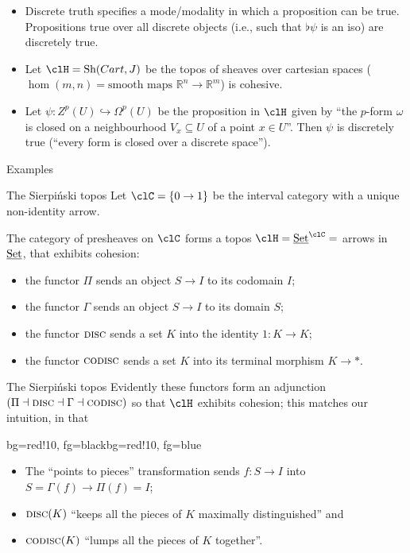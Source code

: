 \documentclass[presentation]{beamer}
\begin{document}
%
%
%
%
%
%
%
\begin{frame}
  \begin{itemize}
    \item<+-> Discrete truth specifies a \alert{mode/modality} in which a proposition can be true. Propositions true over all discrete objects (i.e., such that $\flat\psi$ is an iso) are discretely true.
    \item<+-> Let $\clH = \text{Sh}(Cart,J)$ be the topos of sheaves over cartesian spaces ($\hom(m,n) = \text{smooth maps }\mathbb{R}^n\to \mathbb{R}^m$) is cohesive. \item<+-> Let $\psi\colon Z^p(U) \hookrightarrow \Omega^p(U)$ be the proposition in $\clH$ given by ``the $p$-form $\omega$ is closed on a neighbourhood $V_x\subseteq U$ of a point $x\in U$''. Then $\psi$ is discretely true (``every form is closed over a discrete space'').
  \end{itemize}
\end{frame}
%
%
%
%
%
%
%
\begin{frame}
  \Huge
  \centering
  Examples
\end{frame}
%
%
%
%
%
%
%
\begin{frame}{The Sierpiński topos}
  Let $\clC = \{0\to 1\}$ be the interval category with a unique non-identity arrow.
  \onslide<+->
  
  \medskip
  
  The category of \alert{presheaves} on $\clC$ forms a topos $\clH=\Set^{\clC} =$ arrows in $\underline{\text{Set}}$, that exhibits cohesion:
  \begin{itemize}
    \item<+-> the functor \alert{$\Pi$} sends an object $S\to I$ to its \alert{codomain} $I$;
    \item<+-> the functor \alert{$\Gamma$} sends an object $S\to I$ to its \alert{domain} $S$;
    \item<+-> the functor \alert{$\textsc{disc}$} sends a set $K$ into the \alert{identity} $1\colon K\to K$;
    \item<+-> the functor \alert{$\textsc{codisc}$} sends a set $K$ into its \alert{terminal} morphism $K\to *$.
  \end{itemize}
\end{frame}
%
%
%
%
%
%
%
\begin{frame}{The Sierpiński topos}
  Evidently these functors form an adjunction $(\Pi\dashv\textsc{disc}\dashv\Gamma\dashv\textsc{codisc})$ so that $\clH$ exhibits cohesion; this matches our intuition, in that
  \begin{variableblock}{}{bg=red!10, fg=black}{bg=red!10, fg=blue}
    \begin{itemize}
      \item The ``points to pieces'' transformation sends $f : S\to I$ into $S = \Gamma(f) \to \Pi(f)=I$;
      \item $\textsc{disc}(K)$ ``keeps all the pieces of $K$ maximally distinguished'' and
      \item $\textsc{codisc}(K)$ ``lumps all the pieces of $K$ together''.
    \end{itemize}
  \end{variableblock}
\end{frame}
\end{document}
